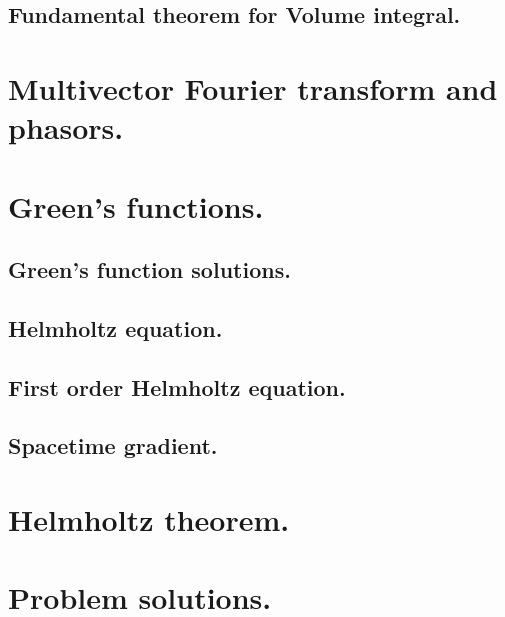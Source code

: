       \subsection{Fundamental theorem for Volume integral.}
         
   \section{Multivector Fourier transform and phasors.}
      
   \section{Green's functions.}
      
      \subsection{Green's function solutions.}
         
      \subsection{Helmholtz equation.}
         
      \subsection{First order Helmholtz equation.}
         
      \subsection{Spacetime gradient.}
         
   \section{Helmholtz theorem.}
      
      
   \section{Problem solutions.}
      \shipoutAnswer
